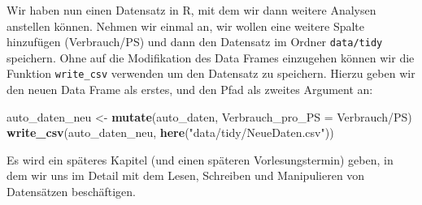 \documentclass[]{tufte-book}
\newenvironment{Shaded}{}{}
\newcommand{\KeywordTok}[1]{\textcolor[rgb]{0.00,0.44,0.13}{\textbf{#1}}}
\newcommand{\DataTypeTok}[1]{\textcolor[rgb]{0.56,0.13,0.00}{#1}}
\newcommand{\StringTok}[1]{\textcolor[rgb]{0.25,0.44,0.63}{#1}}
\newcommand{\OperatorTok}[1]{\textcolor[rgb]{0.40,0.40,0.40}{#1}}
\newcommand{\NormalTok}[1]{#1}
\begin{document}
Wir haben nun einen Datensatz in R, mit dem wir dann weitere Analysen
anstellen können. Nehmen wir einmal an, wir wollen eine weitere Spalte
hinzufügen (Verbrauch/PS) und dann den Datensatz im Ordner
\texttt{data/tidy} speichern. Ohne auf die Modifikation des Data Frames
einzugehen können wir die Funktion \texttt{write\_csv} verwenden um den
Datensatz zu speichern. Hierzu geben wir den neuen Data Frame als
erstes, und den Pfad als zweites Argument an:

\begin{Shaded}
\begin{Highlighting}[]
\NormalTok{auto_daten_neu <-}\StringTok{ }\KeywordTok{mutate}\NormalTok{(auto_daten, }\DataTypeTok{Verbrauch_pro_PS =}\NormalTok{ Verbrauch}\OperatorTok{/}\NormalTok{PS)}
\KeywordTok{write_csv}\NormalTok{(auto_daten_neu, }\KeywordTok{here}\NormalTok{(}\StringTok{"data/tidy/NeueDaten.csv"}\NormalTok{))}
\end{Highlighting}
\end{Shaded}

Es wird ein späteres Kapitel (und einen späteren Vorlesungstermin)
geben, in dem wir uns im Detail mit dem Lesen, Schreiben und
Manipulieren von Datensätzen beschäftigen.

\appendix



\end{document}
